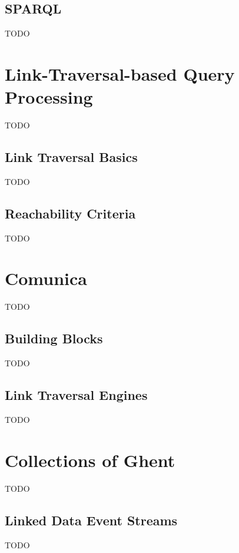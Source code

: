 \subsection{SPARQL}
\label{subsec:sparql}

TODO

\section{Link-Traversal-based Query Processing}
\label{sec:ltqp}

TODO

\subsection{Link Traversal Basics}

TODO

\subsection{Reachability Criteria}

TODO

\section{Comunica}
\label{sec:comunica}

TODO

\subsection{Building Blocks}

TODO

\subsection{Link Traversal Engines}

TODO

\section{Collections of Ghent}
\label{sec:coghent}

TODO

\subsection{Linked Data Event Streams}
\label{subsec:ldes}

TODO

